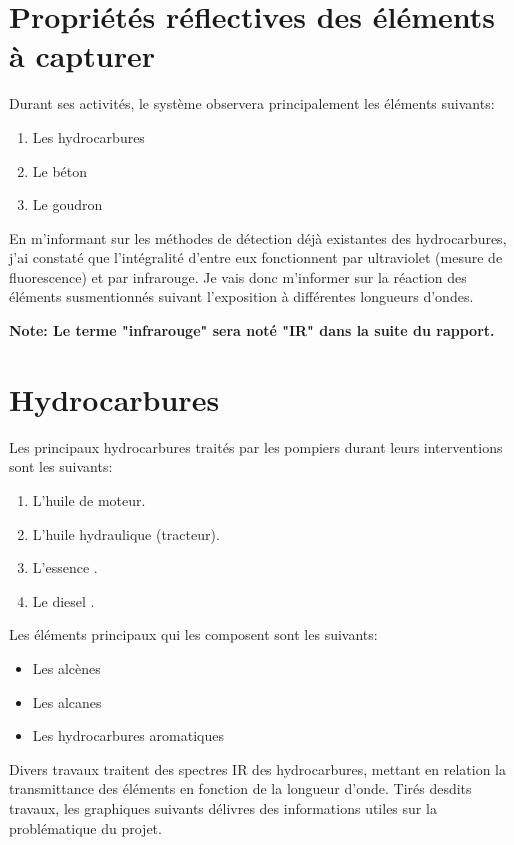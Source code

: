 \section{Propriétés réflectives des éléments à capturer}
Durant ses activités, le système observera principalement les éléments suivants:
\begin{enumerate}
    \item Les hydrocarbures
    \item Le béton
    \item Le goudron
\end{enumerate}
En m'informant sur les méthodes de détection déjà existantes des hydrocarbures, j'ai constaté que l'intégralité d'entre eux fonctionnent
par ultraviolet (mesure de fluorescence) et par infrarouge. Je vais donc m'informer sur la réaction des éléments susmentionnés suivant l'exposition à différentes longueurs d'ondes.

\textbf{Note: Le terme "infrarouge" sera noté "IR" dans la suite du rapport.}
\section{Hydrocarbures}
Les principaux hydrocarbures traités par les pompiers durant leurs interventions sont les suivants:
\begin{enumerate}
    \item L'huile de moteur.
    \item L'huile hydraulique (tracteur).
    \item L'essence \cite{TotalEnergies}.
    \item Le diesel \cite{TotalEnergies}.
\end{enumerate}
Les éléments principaux qui les composent sont les suivants:
\begin{itemize}
    \item Les alcènes
    \item Les alcanes
    \item Les hydrocarbures aromatiques
\end{itemize}
Divers travaux \cite{Hydrocarbures} traitent des spectres IR des hydrocarbures, mettant en relation la transmittance des éléments en fonction de la longueur d'onde.
Tirés desdits travaux, les graphiques suivants délivres des informations utiles sur la problématique du projet.

